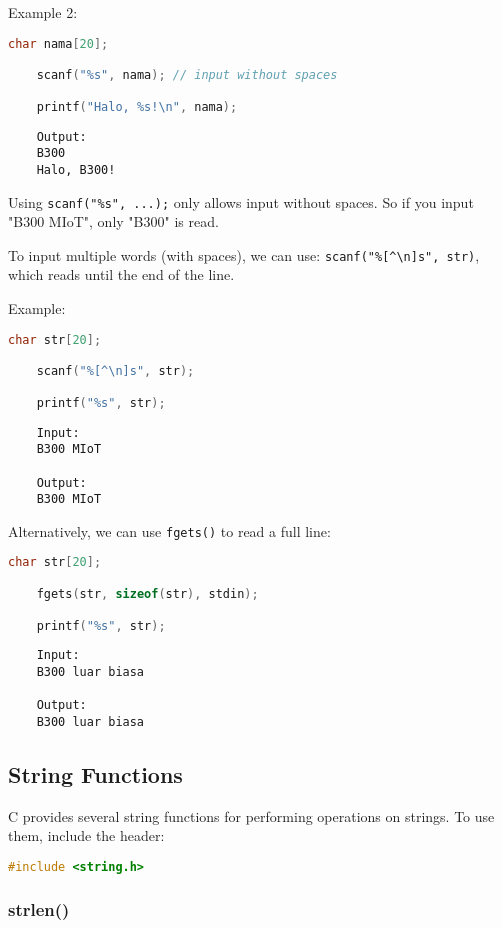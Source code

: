 Example 2:
\begin{lstlisting}[language=c]
	char nama[20];

	scanf("%s", nama); // input without spaces

	printf("Halo, %s!\n", nama);
\end{lstlisting}
\begin{verbatim}
	Output:
	B300
	Halo, B300!
\end{verbatim}

Using \verb|scanf("%s", ...);| only allows input without spaces.  
So if you input "B300 MIoT", only "B300" is read.  

To input multiple words (with spaces), we can use:
\verb|scanf("%[^\n]s", str)|, which reads until the end of the line.

Example:
\begin{lstlisting}[language=c]
	char str[20];

	scanf("%[^\n]s", str);

	printf("%s", str);
\end{lstlisting}
\begin{verbatim}
	Input:
	B300 MIoT

	Output:
	B300 MIoT
\end{verbatim}

Alternatively, we can use \verb|fgets()| to read a full line:
\begin{lstlisting}[language=c]
	char str[20];

	fgets(str, sizeof(str), stdin);

	printf("%s", str);
\end{lstlisting}
\begin{verbatim}
	Input:
	B300 luar biasa

	Output:
	B300 luar biasa
\end{verbatim}

\subsection{String Functions}

C provides several string functions for performing operations on strings.  
To use them, include the header:
\begin{lstlisting}[language=c]
	#include <string.h>
\end{lstlisting}

\subsubsection{strlen()}

